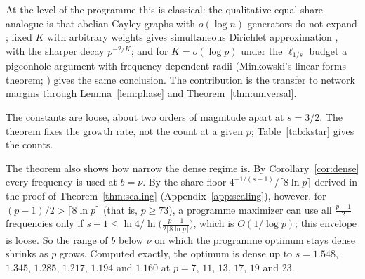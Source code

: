 At the level of the programme this is classical: the qualitative equal-share analogue is that abelian Cayley graphs with $o(\log n)$ generators do not expand \citep[Prop.~3]{alon1994random}; fixed $K$ with arbitrary weights gives simultaneous Dirichlet approximation \citep{schmidt1980diophantine}, with the sharper decay $p^{-2/K}$; and for $K=o(\log p)$ under the $\ell_{1/s}$ budget a pigeonhole argument with frequency-dependent radii (Minkowski's linear-forms theorem; \citealp{cassels1959introduction}) gives the same conclusion. The contribution is the transfer to network margins through Lemma~\ref{lem:phase} and Theorem~\ref{thm:universal}.

The constants are loose, about two orders of magnitude apart at $s=3/2$. The theorem fixes the growth rate, not the count at a given $p$; Table~\ref{tab:kstar} gives the counts.

The theorem also shows how narrow the dense regime is. By Corollary~\ref{cor:dense} every frequency is used at $b=\nu$. By the share floor $4^{-1/(s-1)}/\lceil8\ln p\rceil$ derived in the proof of Theorem~\ref{thm:scaling} (Appendix~\ref{app:scaling}), however, for $(p-1)/2>\lceil8\ln p\rceil$ (that is, $p\ge73$), a programme maximizer can use all $\frac{p-1}2$ frequencies only if $s-1\le\ln4/\ln\big(\frac{p-1}{2\lceil8\ln p\rceil}\big)$, which is $O(1/\log p)$; this envelope is loose. So the range of $b$ below $\nu$ on which the programme optimum stays dense shrinks as $p$ grows. Computed exactly, the optimum is dense up to $s=1.548$, $1.345$, $1.285$, $1.217$, $1.194$ and $1.160$ at $p=7$, $11$, $13$, $17$, $19$ and $23$.
